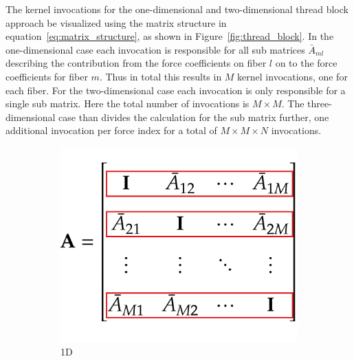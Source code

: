 \documentclass[a4paper,11pt]{kth-mag}
\begin{document}
The kernel invocations for the one-dimensional and two-dimensional thread block approach be visualized using the matrix structure in equation~\eqref{eq:matrix_structure}, as shown in Figure~\ref{fig:thread_block}. In the one-dimensional case each invocation is responsible for all sub matrices $\bar{A}_{ml}$ describing the contribution from the force coefficients on fiber $l$ on to the force coefficients for fiber $m$. Thus in total this results in $M$ kernel invocations, one for each fiber. For the two-dimensional case each invocation is only responsible for a single sub matrix. Here the total number of invocations is $M \times M$. The three-dimensional case than divides the calculation for the sub matrix further, one additional invocation per force index for a total of $M \times M \times N$ invocations.

\begin{figure}[!htbp]
  \centering
  \begin{subfigure}[h]{0.33\textwidth}
    \centering
    \includegraphics[width=\textwidth]{img/thread_block1D.pdf}
    \caption{1D}\label{fig:thread_block_1D}
  \end{subfigure}
  \begin{subfigure}[h]{0.33\textwidth}
    \centering

\end{subfigure}
\end{figure}
\end{document}
